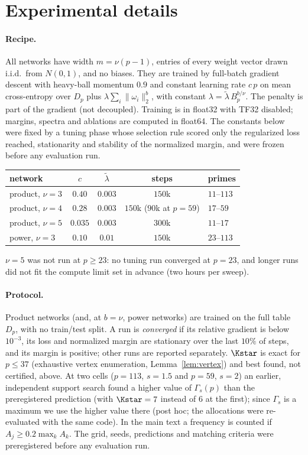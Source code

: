 \section{Experimental details}\label{app:exp}

\paragraph{Recipe.} All networks have width $m=\nu(p-1)$, entries of every weight vector drawn i.i.d.\ from $N(0,1)$, and no biases. They are trained by full-batch gradient descent with heavy-ball momentum $0.9$ and constant learning rate $c\,p$ on mean cross-entropy over $D_p$ plus $\lambda\sum_i\|\omega_i\|_2^b$, with constant $\lambda=\tilde\lambda\,B_p^{b/\nu}$. The penalty is part of the gradient (not decoupled). Training is in float32 with TF32 disabled; margins, spectra and ablations are computed in float64. The constants below were fixed by a tuning phase whose selection rule scored only the regularized loss reached, stationarity and stability of the normalized margin, and were frozen before any evaluation run.

\begin{center}
\small
\begin{tabular}{lcccl}
\toprule
network & $c$ & $\tilde\lambda$ & steps & primes\\
\midrule
product, $\nu=3$ & $0.40$ & $0.003$ & $150$k & $11$--$113$\\
product, $\nu=4$ & $0.28$ & $0.003$ & $150$k ($90$k at $p=59$) & $17$--$59$\\
product, $\nu=5$ & $0.035$ & $0.003$ & $300$k & $11$--$17$\\
power, $\nu=3$ & $0.10$ & $0.01$ & $150$k & $23$--$113$\\
\bottomrule
\end{tabular}
\end{center}

$\nu=5$ was not run at $p\ge23$: no tuning run converged at $p=23$, and longer runs did not fit the compute limit set in advance (two hours per sweep).

\paragraph{Protocol.} Product networks (and, at $b=\nu$, power networks) are trained on the full table $D_p$, with no train/test split. A run is \emph{converged} if its relative gradient is below $10^{-3}$, its loss and normalized margin are stationary over the last $10\%$ of steps, and its margin is positive; other runs are reported separately. $\Kstar$ is exact for $p\le37$ (exhaustive vertex enumeration, Lemma~\ref{lem:vertex}) and best found, not certified, above. At two cells ($p=113$, $s=1.5$ and $p=59$, $s=2$) an earlier, independent support search found a higher value of $\Gamma_s(p)$ than the preregistered prediction (with $\Kstar=7$ instead of $6$ at the first); since $\Gamma_s$ is a maximum we use the higher value there (post hoc; the allocations were re-evaluated with the same code). In the main text a frequency is counted if $A_j\ge0.2\max_kA_k$. The grid, seeds, predictions and matching criteria were preregistered before any evaluation run.

